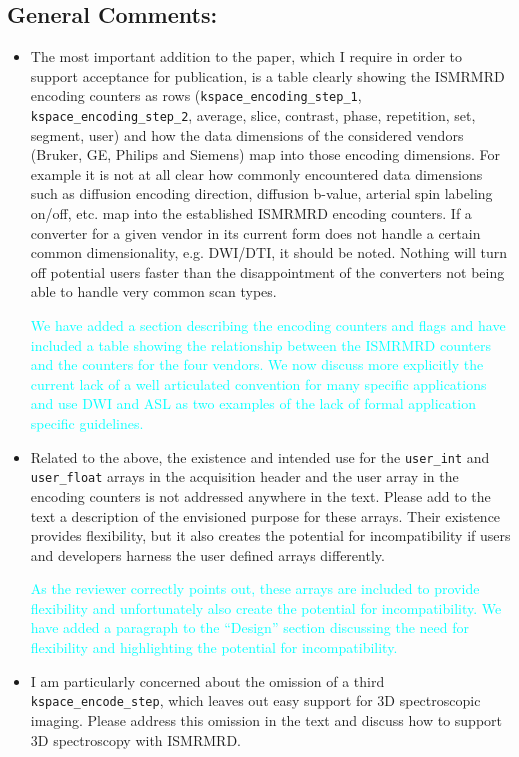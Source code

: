 \documentclass[12pt, draft]{article}
\makeatletter
\def\namedlabel#1#2{\begingroup#2\def\@currentlabel{#2}\phantomsection\label{#1}\endgroup}
\newcommand{\question}[1]{\item[\namedlabel{q#1}{#1}]}
\newcommand{\response}[1]{\textcolor{cyan}{#1}}
\makeatother
\begin{document}
{\subsection*{General Comments:}
\begin{itemize}
\question{R2.1} The most important addition to the paper, which I require in order to support acceptance for publication, is a table clearly showing the ISMRMRD encoding counters as rows (\texttt{kspace\_encoding\_step\_1}, \texttt{kspace\_encoding\_step\_2}, average, slice, contrast, phase, repetition, set, segment, user) and how the data dimensions of the considered vendors (Bruker, GE, Philips and Siemens) map into those encoding dimensions. For example it is not at all clear how commonly encountered data dimensions such as diffusion encoding direction, diffusion b-value, arterial spin labeling on/off, etc. map into the established ISMRMRD encoding counters. If a converter for a given vendor in its current form does not handle a certain common dimensionality, e.g. DWI/DTI, it should be noted. Nothing will turn off potential users faster than the disappointment of the converters not being able to handle very common scan types.

\response{We have added a section describing the encoding counters and flags and have included a table showing the relationship between the ISMRMRD counters and the counters for the four vendors.  We now discuss more explicitly the current lack of a well articulated convention for many specific applications and use DWI and ASL as two examples of the lack of formal application specific guidelines.}

\question{R2.2} Related to the above, the existence and intended use for the \texttt{user\_int} and \texttt{user\_float} arrays in the acquisition header and the user array in the encoding counters is not addressed anywhere in the text. Please add to the text a description of the envisioned purpose for these arrays. Their existence provides flexibility, but it also creates the potential for incompatibility if users and developers harness the user defined arrays differently.

\response{As the reviewer correctly points out, these arrays are included to provide flexibility and unfortunately also create the potential for incompatibility.  We have added a paragraph to the ``Design'' section discussing the need for flexibility and highlighting the potential for incompatibility.}

\question{R2.3} I am particularly concerned about the omission of a third \texttt{kspace\_encode\_step}, which leaves out easy support for 3D spectroscopic imaging. Please address this omission in the text and discuss how to support 3D spectroscopy with ISMRMRD.


\end{itemize}}
\end{document}
